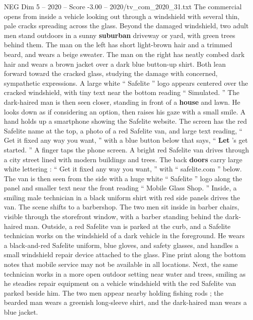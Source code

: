 \begin{textsample}{NEG Dim 5 – 2020 – Score -3.00 – 2020/tv\_com\_2020\_31.txt}  \label{ex:f5_neg_037}
The commercial opens from inside a vehicle looking out through a windshield with several thin, pale cracks spreading across the glass.
Beyond the damaged windshield, two adult men stand outdoors in a sunny \textbf{suburban} driveway or yard, with green trees behind them.
The man on the left has short light-brown hair and a trimmed beard, and wears a beige sweater.
The man on the right has neatly combed dark hair and wears a brown jacket over a dark blue button-up shirt.
Both lean forward toward the cracked glass, studying the damage with concerned, sympathetic expressions.
A large white “ Safelite ” logo appears centered over the cracked windshield, with tiny text near the bottom reading “ Simulated. ” The dark-haired man is then seen closer, standing in front of a \textbf{house} and lawn.
He looks down as if considering an option, then raises his gaze with a small smile.
A hand holds up a smartphone showing the Safelite website.
The screen has the red Safelite name at the top, a photo of a red Safelite van, and large text reading, “ Get it fixed any way you want, ” with a blue button below that says, “ \textbf{Let} ’s get started. ” A finger taps the phone screen.
A bright red Safelite van drives through a city street lined with modern buildings and trees.
The back \textbf{doors} carry large white lettering : “ Get it fixed any way you want, ” with “ safelite.com ” below.
The van is then seen from the side with a huge white “ Safelite ” logo along the panel and smaller text near the front reading “ Mobile Glass Shop. ” Inside, a smiling male technician in a black uniform shirt with red side panels drives the van.
The scene shifts to a barbershop.
The two men sit inside in barber chairs, visible through the storefront window, with a barber standing behind the dark-haired man.
Outside, a red Safelite van is parked at the curb, and a Safelite technician works on the windshield of a dark vehicle in the foreground.
He wears a black-and-red Safelite uniform, blue gloves, and safety glasses, and handles a small windshield repair device attached to the glass.
Fine print along the bottom notes that mobile service may not be available in all locations.
Next, the same technician works in a more open outdoor setting near water and trees, smiling as he steadies repair equipment on a vehicle windshield with the red Safelite van parked beside him.
The two men appear nearby holding fishing rods ; the bearded man wears a greenish long-sleeve shirt, and the dark-haired man wears a blue jacket.

\end{textsample}
